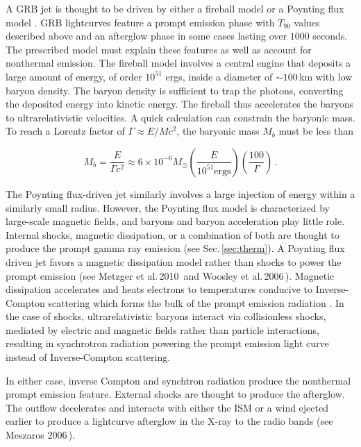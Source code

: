 \documentclass{article}
\begin{document}
A GRB jet is thought to be driven by either a fireball model \cite{Rosswog:2007ap} or a Poynting flux model \cite{Metzger:2010pp}. GRB lightcurves feature a prompt emission phase with $T_{90}$ values described above and an afterglow phase in some cases lasting over $1000$ seconds. The prescribed model must explain these features as well as account for nonthermal emission. 
The fireball model involves a central engine that deposits a large amount of energy, of order $10^{51}$ ergs, inside a diameter of $\sim 100$\,km with low baryon density. The baryon density is sufficient to trap the photons, converting the deposited energy into kinetic energy. The fireball thus accelerates the baryons to ultrarelativistic velocities. A quick calculation can constrain the baryonic mass. To reach a Lorentz factor of $\Gamma \approx E/M c^2$, the baryonic mass $M_b$ must be less than

\begin{equation}
M_{b} = \frac{E}{\Gamma c^2} \approx 6 \times 10^{-6} M_{\odot} \left(\frac{E}{10^{51} \mathrm{ergs}}\right) \left(\frac{100}{\Gamma}\right)\,.
\end{equation}

The Poynting flux-driven jet similarly involves a large injection of energy within a similarly small radius. However, the Poynting flux model is characterized by large-scale magnetic fields, and baryons and baryon acceleration play little role. Internal shocks, magnetic dissipation, or a combination of both are thought to produce the prompt gamma ray emission (see Sec.\,\ref{sec:therm}). A Poynting flux driven jet favors a magnetic dissipation model rather than shocks to power the prompt emission (see Metzger et al.\,2010\,\cite{Metzger:2010pp} and Woosley et al.\,2006\,\cite{Woosley:2006fn}). Magnetic dissipation accelerates and heats electrons to temperatures conducive to Inverse-Compton scattering which forms the bulk of the prompt emission radiation \cite{Metzger:2010pp}. In the case of shocks, ultrarelativistic baryons interact via collisionless shocks, mediated by electric and magnetic fields rather than particle interactions, resulting in synchrotron radiation powering the prompt emission light curve instead of Inverse-Compton scattering\cite{Metzger:2010pp}. 

In either case, inverse Compton and synchtron radiation produce the nonthermal prompt emission feature. External shocks are thought to produce the afterglow. The outflow decelerates and interacts with either the ISM or a wind ejected earlier to produce a lightcurve afterglow in the X-ray to the radio bands (see Meszaros 2006\,\cite{Meszaros:2006rc}).
 
\end{document}
